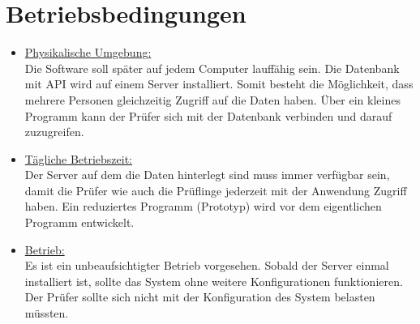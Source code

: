 	\section{Betriebsbedingungen}
	
	\begin{itemize}
	\item \underline{Physikalische Umgebung:}\\
	Die Software soll später auf jedem Computer lauffähig sein. Die Datenbank mit API wird auf einem Server installiert. Somit besteht die Möglichkeit, dass mehrere Personen gleichzeitig Zugriff auf die Daten haben. Über ein kleines Programm kann der Prüfer sich mit der Datenbank verbinden und darauf zuzugreifen.
	
	\item \underline{Tägliche Betriebszeit:} \\
	Der Server auf dem die Daten hinterlegt sind muss immer verfügbar sein, damit die Prüfer wie auch die Prüflinge jederzeit mit der Anwendung Zugriff haben.
	Ein reduziertes Programm (Prototyp) wird vor dem eigentlichen Programm entwickelt.
		
	\item \underline{Betrieb:} \\
	Es ist ein unbeaufsichtigter Betrieb vorgesehen. Sobald der Server einmal installiert ist, sollte das System ohne weitere Konfigurationen funktionieren. Der Prüfer sollte sich nicht mit der Konfiguration des System belasten müssten. 	
	\end{itemize}
